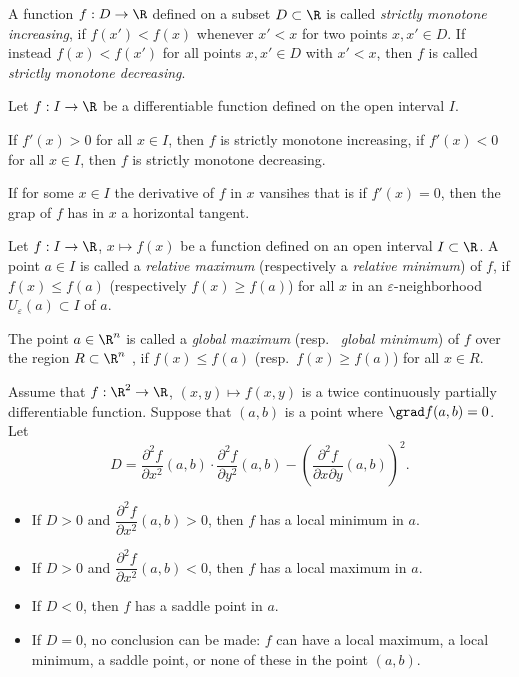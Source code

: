 \begin{definition}
   A function $f:D \rightarrow \R$ defined on a subset $D \subset \R$
   is called \emph{strictly monotone increasing}, if $f(x') < f(x)$ 
   whenever $x' < x $ for two points $x,x'\in D$.
   If instead $f(x) < f(x')$ for all points  $x,x'\in D$ with  $x' < x $,
   then $f$ is called \emph{strictly monotone decreasing}.
\end{definition}

\begin{proposition}
   Let $f:I \to \R$ be a differentiable function defined on the 
   open interval $I$. 
   \begin{letterlist}
   \item   
      If $f'(x) >0$ for all $x \in I$, then 
      $f$ is strictly monotone increasing, if $f'(x) <0$ for all $x\in I$, 
      then $f$ is strictly monotone decreasing. 
   \item
      If for some $x\in I$ the derivative of $f$ in $x$ vansihes that is if 
      $f'(x) =0$, then the grap of $f$ has in $x$ a horizontal tangent.  
   \end{letterlist}
  
\end{proposition}

\begin{definition}
   Let $f:I \rightarrow \R$, $x\mapsto f(x)$ be a function defined
   on an open interval $I\subset \R$. 
   A point $a\in I$ is called a \emph{relative maximum} 
   (respectively a \emph{relative minimum}) of $f$, if
   $f(x)\leq f(a)$ (respectively $f(x)\geq f(a)$) for all $x$ 
   in an $\varepsilon$-neighborhood $U_\varepsilon (a) \subset I $ of $a$.

   The point $a\in \R^n$ is called a \emph{global maximum} (resp.~ \emph{global minimum}) of $f$
   over the region $R\subset \R^n$ , if $f(x)\leq f(a)$ (resp.~$f(x)\geq f(a)$) for all $x\in R$.
\end{definition}

\begin{theorem}
  Assume that $f:\R^2 \rightarrow \R$, $(x,y)\mapsto f(x,y)$ is a twice continuously partially 
  differentiable function.
  Suppose that $(a,b)$ is a point where $\grad f(a,b)=0$. Let 
  \[
        D = \dfrac{\partial^2f}{\partial x^2}(a,b)\cdot \dfrac{\partial^2f}{\partial y^2}(a,b) -
            \left( \dfrac{\partial^2f}{\partial x \partial y} (a,b) \right)^2 .
  \]
  \begin{itemize}
  \item If $D>0$ and $\dfrac{\partial^2f}{\partial x^2}(a,b)>0$, then $f$ has a local minimum in $a$.
  \item If $D>0$ and $\dfrac{\partial^2f}{\partial x^2}(a,b)<0$, then $f$ has a local maximum in $a$.
  \item If $D<0$, then $f$ has a saddle point in $a$.
  \item If $D=0$, no conclusion can be made: $f$ can have a local maximum, a local minimum, a saddle
  point, or none of these in the point $(a,b)$.  
  \end{itemize}
\end{theorem}
  
